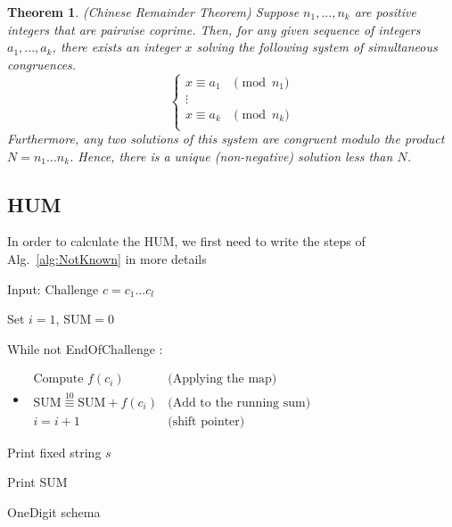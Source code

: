 \documentclass{article}
\newtheorem{theorem}{Theorem}
\newenvironment{alg}{
    \begin{list}{}{
        \setlength{\itemsep}{2pt}
        \setlength{\parsep}{0pt}
        \setlength{\parskip}{0pt}
        \setlength{\topsep}{1pt}
    }
}
{
    \end{list}
}
\begin{document}
\begin{theorem}(Chinese Remainder Theorem)
\label{chinese}
Suppose $n_1, ..., n_k$ are positive integers that are pairwise coprime. Then, for any given sequence of integers $a_1, ..., a_k$, there exists an integer $x$ solving the following system of simultaneous congruences.
$$
\left\{ \begin{array}{cl}
     x \equiv a_1 &\pmod{n_1} \\
      \vdots &\\
      x \equiv a_k &\pmod{n_k} \\
\end{array} \right.		
$$
Furthermore, any two solutions of this system are congruent modulo the product $N = n_1 \ldots n_k$. Hence, there is a unique (non-negative) solution less than $N$.
\end{theorem}



	
	






\subsection{HUM}
In order to calculate the HUM, we first need to write the steps of Alg.~\ref{alg:NotKnown} in more details

\begin{algorithm}
\begin{alg}
\item[] Input: Challenge $c=c_1 \ldots c_l$
\item[] Set $i=1$, SUM$=0$
\item[] While not EndOfChallenge :

\begin{itemize}
	\item[] $\begin{array}{lr}
		\text{Compute } f(c_i) & \text{(Applying the map)} \\
		\text{SUM} \overset{10}{\equiv} \text{SUM} + f(c_i) & \text{(Add to the running sum)} \\
			i=i+1 & \text{(shift pointer)} 
	\end{array}$
\end{itemize}

\item[] Print fixed string $s$
\item[] Print SUM

\label{alg:HUM}
\end{alg}
\caption{OneDigit schema}
\end{algorithm}
\end{document}
